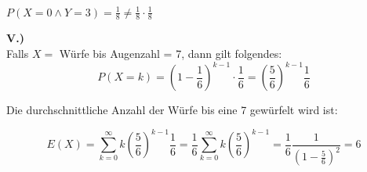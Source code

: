 \documentclass[12pt]{scrartcl}
\begin{document}
$P(X = 0 \land Y = 3) = \frac{1}{8} \neq \frac{1}{8} \cdot \frac{1}{8}$

\newpage
\textbf{V.)}\\
Falls $X = $ Würfe bis Augenzahl = 7, dann gilt folgendes:\\
\[P(X=k) = \left(1-\frac{1}{6}\right)^{k-1} \cdot \frac{1}{6} = \left(\frac{5}{6}\right)^{k-1} \frac{1}{6}\]


Die durchschnittliche Anzahl der Würfe bis eine 7 gewürfelt wird ist:

\[E(X) = \sum_{k=0}^{\infty} k \left(\frac{5}{6}\right)^{k-1} \frac{1}{6} = \frac{1}{6} \sum_{k=0}^{\infty} k \left( \frac{5}{6} \right)^{k-1} = \frac{1}{6} \frac{1}{(1-\frac{5}{6})^2} = 6\]







% 
\end{document}
